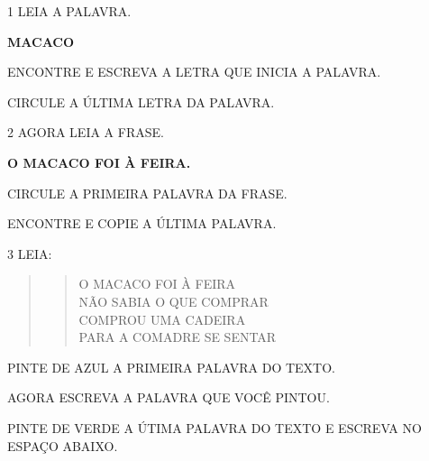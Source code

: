 \num{1} LEIA A PALAVRA.

\begin{myquote}
\textbf{MACACO}
\end{myquote}

\begin{escolha}
\item ENCONTRE E ESCREVA A LETRA QUE INICIA A PALAVRA.

\item CIRCULE A ÚLTIMA LETRA DA PALAVRA.
\end{escolha}

\num{2} AGORA LEIA A FRASE.

\begin{myquote}
\textbf{O MACACO FOI À FEIRA.}
\end{myquote}

\begin{escolha}
\item CIRCULE A PRIMEIRA PALAVRA DA FRASE.

\item ENCONTRE E COPIE A ÚLTIMA PALAVRA.
\end{escolha}\enlargethispage{5\baselineskip}

\num{3} LEIA:

\begin{quote}
\begin{verse}
O MACACO FOI À FEIRA\\
NÃO SABIA O QUE COMPRAR\\
COMPROU UMA CADEIRA\\
PARA A COMADRE SE SENTAR
\end{verse}

\end{quote}
\pagebreak

\begin{escolha}
\item PINTE DE AZUL A PRIMEIRA PALAVRA DO TEXTO.

\item AGORA ESCREVA A PALAVRA QUE VOCÊ PINTOU.


\item PINTE DE VERDE A ÚTIMA PALAVRA DO TEXTO E ESCREVA NO ESPAÇO ABAIXO.

\end{escolha}

